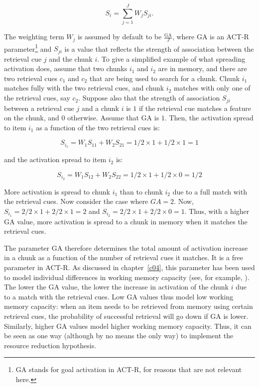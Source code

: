 \documentclass{cambridge7A}\usepackage[]{graphicx}\usepackage[]{color}
\begin{document}
\begin{equation}\label{eq:2}
  S_i = \sum_{j=1}^J W_j S_{ji}.
\end{equation}

\noindent
The weighting term $W_j$ is assumed by default to be $\frac{\text{GA}}{J}$, where GA is an ACT-R parameter\footnote{GA stands for goal activation in ACT-R, for reasons that are not relevant here.} and $S_{ji}$ is a value that  reflects the strength of association between  the retrieval cue $j$ and the chunk $i$. To give a simplified  example of what spreading activation does, assume that two chunks $i_1$ and $i_2$ are in memory, and there are two retrieval cues $c_1$ and $c_2$ that are being used to search for a chunk. Chunk $i_1$ matches fully with the two retrieval cues, and chunk $i_2$ matches with only one of the retrieval cues, say $c_2$.  Suppose also that the strength of association $S_{ji}$ between a retrieval cue $j$ and a chunk $i$ is $1$ if the retrieval cue matches a feature on the chunk, and $0$ otherwise. Assume that GA is $1$.
Then, the activation spread to item $i_1$ as a function of the two retrieval cues is: 

\begin{equation}
  S_{i_1} = W_1 S_{11}+W_2 S_{21}=1/2 \times 1 + 1/2 \times 1 = 1
\end{equation}

and the activation spread to item $i_2$ is:

\begin{equation}
  S_{i_2} = W_1 S_{12}+W_2 S_{22}=1/2 \times 1 + 1/2 \times 0 = 1/2
\end{equation}

More activation is spread to chunk $i_1$ than to chunk $i_2$ due to a full match with the retrieval cues. Now consider the case where $GA=2$. Now, 
$S_{i_1}= 2/2 \times 1 + 2/2 \times 1 = 2$ and 
$S_{i_2}= 2/2 \times 1 + 2/2 \times 0 = 1$. Thus, with a higher GA value, more activation is spread to a chunk in memory when it matches the retrieval cues.

The parameter GA therefore determines the total amount of activation increase in a chunk as a function of the number of retrieval cues it matches. It is a free parameter in ACT-R. As discussed in chapter~\ref{c04}, this parameter 
has been used to model individual differences in working memory capacity (see, for example, \citealp{DailyEtAl2001}). 
The lower the GA value, the lower the increase in activation of the chunk $i$ due to a match with the retrieval cues.
Low GA values thus model low working memory capacity: when an item needs to be retrieved from memory using certain retrieval cues, the probability of successful retrieval will go down if GA is lower.
Similarly, higher GA values model higher working memory capacity.
Thus, it can be seen as one way (although by no means the only way) to implement the resource reduction hypothesis. 
\end{document}
